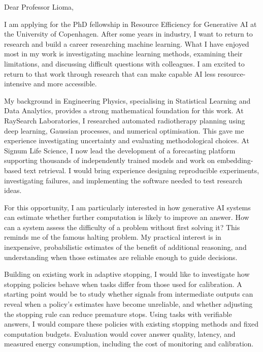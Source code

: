 \documentclass[11pt,a4paper]{moderncv}
\begin{document}
\makecvtitle

Dear Professor Lioma,

\vspace*{2em}
I am applying for the PhD fellowship in Resource Efficiency for Generative AI at the University of Copenhagen. After some years in industry, I want to return to research and build a career researching machine learning. What I have enjoyed most in my work is investigating machine learning methods, examining their limitations, and discussing difficult questions with colleagues. I am excited to return to that work through research that can make capable AI less resource-intensive and more accessible.

\vspace{4pt}
\hspace*{2em}
My background in Engineering Physics, specialising in Statistical Learning and Data Analytics, provides a strong mathematical foundation for this work. At RaySearch Laboratories, I researched automated radiotherapy planning using deep learning, Gaussian processes, and numerical optimisation. This gave me experience investigating uncertainty and evaluating methodological choices. At Signum Life Science, I now lead the development of a forecasting platform supporting thousands of independently trained models and work on embedding-based text retrieval. I would bring experience designing reproducible experiments, investigating failures, and implementing the software needed to test research ideas.

\vspace{4pt}
\hspace*{2em}
For this opportunity, I am particularly interested in how generative AI systems can estimate whether further computation is likely to improve an answer. How can a system assess the difficulty of a problem without first solving it? This reminds me of the famous halting problem. My practical interest is in inexpensive, probabilistic estimates of the benefit of additional reasoning, and understanding when those estimates are reliable enough to guide decisions.

\vspace{4pt}
\hspace*{2em}
Building on existing work in adaptive stopping, I would like to investigate how stopping policies behave when tasks differ from those used for calibration. A starting point would be to study whether signals from intermediate outputs can reveal when a policy's estimates have become unreliable, and whether adjusting the stopping rule can reduce premature stops. Using tasks with verifiable answers, I would compare these policies with existing stopping methods and fixed computation budgets. Evaluation would cover answer quality, latency, and measured energy consumption, including the cost of monitoring and calibration.
\end{document}
